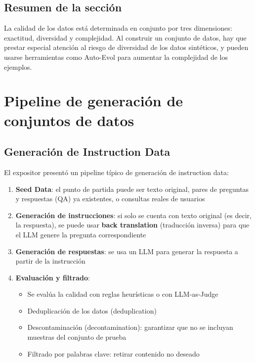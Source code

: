 \documentclass[a4paper]{article}
\begin{document}
\subsection{Resumen de la sección}

La calidad de los datos está determinada en conjunto por tres dimensiones: exactitud, diversidad y complejidad. Al construir un conjunto de datos, hay que prestar especial atención al riesgo de diversidad de los datos sintéticos, y pueden usarse herramientas como Auto-Evol para aumentar la complejidad de los ejemplos.

\newpage
\section{Pipeline de generación de conjuntos de datos}

\subsection{Generación de Instruction Data}

El expositor presentó un pipeline típico de generación de instruction data:

\begin{enumerate}
    \item \textbf{Seed Data}: el punto de partida puede ser texto original, pares de preguntas y respuestas (QA) ya existentes, o consultas reales de usuarios
    \item \textbf{Generación de instrucciones}: si solo se cuenta con texto original (es decir, la respuesta), se puede usar \textbf{back translation} (traducción inversa) para que el LLM genere la pregunta correspondiente
    \item \textbf{Generación de respuestas}: se usa un LLM para generar la respuesta a partir de la instrucción
    \item \textbf{Evaluación y filtrado}:
    \begin{itemize}
        \item Se evalúa la calidad con reglas heurísticas o con LLM-as-Judge
        \item Deduplicación de los datos (deduplication)
        \item Descontaminación (decontamination): garantizar que no se incluyan muestras del conjunto de prueba
        \item Filtrado por palabras clave: retirar contenido no deseado
    \end{itemize}
\end{enumerate}
\end{document}
